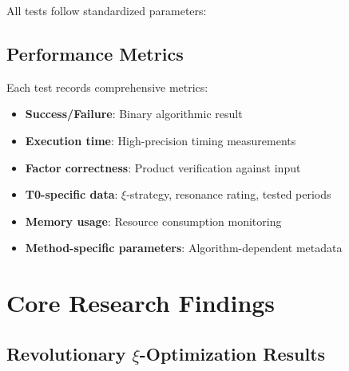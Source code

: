 	All tests follow standardized parameters:
	\begin{table}[H]
		\centering
		\caption{Standardized Test Parameters}
	\end{table}
	
	\subsection{Performance Metrics}
	
	Each test records comprehensive metrics:
	\begin{itemize}
		\item \textbf{Success/Failure}: Binary algorithmic result
		\item \textbf{Execution time}: High-precision timing measurements
		\item \textbf{Factor correctness}: Product verification against input
		\item \textbf{T0-specific data}: $\xi$-strategy, resonance rating, tested periods
		\item \textbf{Memory usage}: Resource consumption monitoring
		\item \textbf{Method-specific parameters}: Algorithm-dependent metadata
	\end{itemize}
	
	\section{Core Research Findings}
	
	\subsection{Revolutionary $\xi$-Optimization Results}
	

